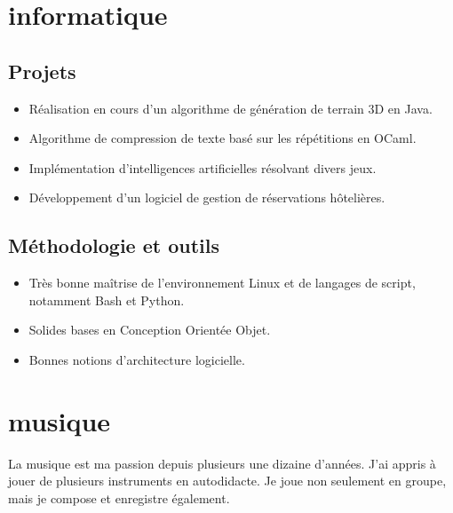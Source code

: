 \section{informatique}
\subsection{Projets}
    \begin{itemize}
        \item Réalisation en cours d'un algorithme de génération de terrain 3D
            en Java.
        \item Algorithme de compression de texte basé sur les répétitions en
            OCaml.
        \item Implémentation d'intelligences artificielles résolvant divers jeux.
        \item Développement d'un logiciel de gestion de réservations hôtelières.
    \end{itemize}
\subsection{Méthodologie et outils}
    \begin{itemize}
        \item Très bonne maîtrise de l'environnement Linux et de langages de
            script, notamment Bash et Python.
        \item Solides bases en Conception Orientée Objet.
        \item Bonnes notions d'architecture logicielle.
    \end{itemize}



\section{musique}
\vspace{-0.2cm}
La musique est ma passion depuis plusieurs une dizaine d'années.
J'ai appris à jouer de plusieurs instruments en autodidacte. Je joue non
seulement en groupe, mais je compose et enregistre également.
